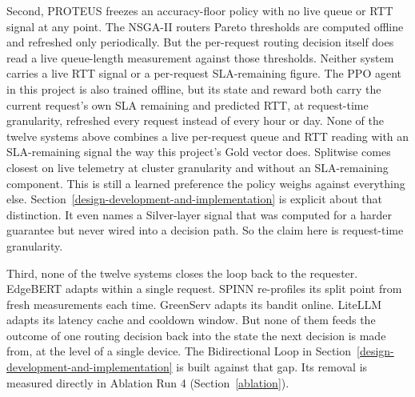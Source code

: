Second, PROTEUS freezes an accuracy-floor policy with no live queue or
RTT signal at any point. The NSGA-II routers Pareto thresholds are
computed offline and refreshed only periodically. But the per-request
routing decision itself does read a live queue-length measurement
against those thresholds. Neither system carries a live RTT signal or a
per-request SLA-remaining figure. The PPO agent in this project is also
trained offline, but its state and reward both carry the current
request's own SLA remaining and predicted RTT, at request-time
granularity, refreshed every request instead of every hour or day.
None of the twelve systems above combines a live per-request queue and
RTT reading with an SLA-remaining signal the way this project's Gold
vector does. Splitwise comes closest on live telemetry at
cluster granularity and without an SLA-remaining
component. This is still a learned preference the policy weighs against
everything else. Section~\ref{design-development-and-implementation} is explicit about that distinction. 
It even names a Silver-layer signal that was computed for a harder 
guarantee but never wired into a decision path. So the claim here is 
request-time granularity.

Third, none of the twelve systems closes the loop back to the
requester. EdgeBERT adapts within a single request. SPINN re-profiles
its split point from fresh measurements each time. GreenServ adapts
its bandit online. LiteLLM adapts its latency cache and cooldown
window. But none of them feeds the outcome of one routing decision back
into the state the next decision is made from, at the level of a
single device. The Bidirectional Loop in Section~\ref{design-development-and-implementation} is built against
that gap. Its removal is measured directly in Ablation Run 4 (Section~\ref{ablation}).

